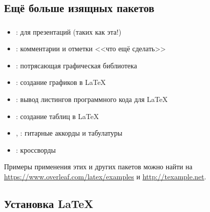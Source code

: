 \documentclass{beamer}
\begin{document}
\subsection{Ещё больше изящных пакетов}

\begin{frame}
\frametitle{\insertsubsection}
\begin{itemize}
  \item {}: для презентаций (таких как эта!)
\item {}: комментарии и отметки <<что ещё сделать>>
\item {}: потрясающая графическая библиотека
\item {}: создание графиков в \LaTeX
\item {}: вывод листингов программного кода для \LaTeX
\item {}: создание таблиц в \LaTeX
\item {}, : гитарные аккорды и табулатуры
\item {}: кроссворды
\end{itemize}
Примеры применения этих и других пакетов можно найти на
\url{https://www.overleaf.com/latex/examples} и \url{http://texample.net}.
\end{frame}

\subsection{Установка \LaTeX{}}
\end{document}
